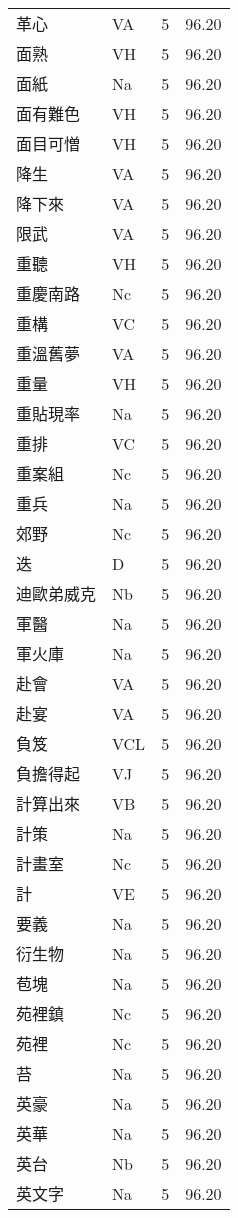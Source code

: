 \documentclass[twocolumn]{book}
\begin{document}
\begin{supertabular}{llrr}
革心 & VA & 5 &  96.20\\
面熟 & VH & 5 &  96.20\\
面紙 & Na & 5 &  96.20\\
面有難色 & VH & 5 &  96.20\\
面目可憎 & VH & 5 &  96.20\\
降生 & VA & 5 &  96.20\\
降下來 & VA & 5 &  96.20\\
限武 & VA & 5 &  96.20\\
重聽 & VH & 5 &  96.20\\
重慶南路 & Nc & 5 &  96.20\\
重構 & VC & 5 &  96.20\\
重溫舊夢 & VA & 5 &  96.20\\
重量 & VH & 5 &  96.20\\
重貼現率 & Na & 5 &  96.20\\
重排 & VC & 5 &  96.20\\
重案組 & Nc & 5 &  96.20\\
重兵 & Na & 5 &  96.20\\
郊野 & Nc & 5 &  96.20\\
迭 & D & 5 &  96.20\\
迪歐弟威克 & Nb & 5 &  96.20\\
軍醫 & Na & 5 &  96.20\\
軍火庫 & Na & 5 &  96.20\\
赴會 & VA & 5 &  96.20\\
赴宴 & VA & 5 &  96.20\\
負笈 & VCL & 5 &  96.20\\
負擔得起 & VJ & 5 &  96.20\\
計算出來 & VB & 5 &  96.20\\
計策 & Na & 5 &  96.20\\
計畫室 & Nc & 5 &  96.20\\
計 & VE & 5 &  96.20\\
要義 & Na & 5 &  96.20\\
衍生物 & Na & 5 &  96.20\\
苞塊 & Na & 5 &  96.20\\
苑裡鎮 & Nc & 5 &  96.20\\
苑裡 & Nc & 5 &  96.20\\
苔 & Na & 5 &  96.20\\
英豪 & Na & 5 &  96.20\\
英華 & Na & 5 &  96.20\\
英台 & Nb & 5 &  96.20\\
英文字 & Na & 5 &  96.20\\

\end{supertabular}
\end{document}
